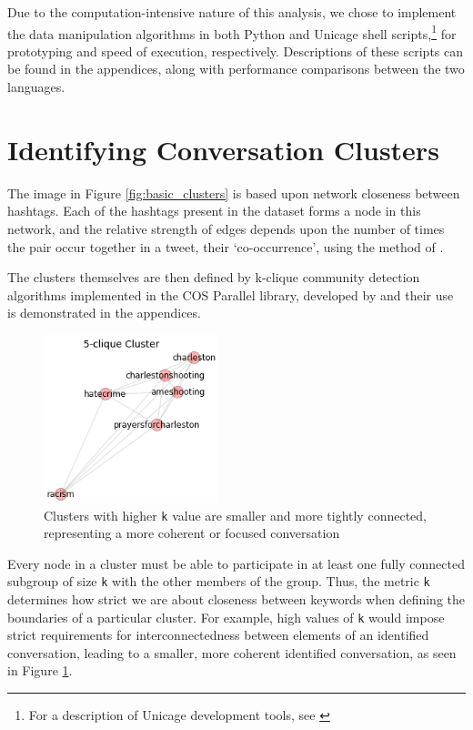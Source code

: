 \documentclass[12pt]{article}
\begin{document}
Due to the computation-intensive nature of this analysis, we chose to implement the data manipulation algorithms in both Python and Unicage shell scripts,\footnote{For a description of Unicage development tools, see \cite{Tounaka2013}} for prototyping and speed of execution, respectively. 
Descriptions of these scripts can be found in the appendices, along with performance comparisons between the two languages.

\section{Identifying Conversation Clusters}
The image in Figure \ref{fig:basic_clusters} is based upon network closeness between hashtags. Each of the hashtags present in the dataset forms a node in this network, and the relative strength of edges depends upon the number of times the pair occur together in a tweet, their `co-occurrence', using the method of \cite{Marres}.

The clusters themselves are then defined by k-clique community detection algorithms implemented in the COS Parallel library, developed by \cite{Gregori2013} and their use is demonstrated in the appendices.

\begin{figure}[!ht]
  \centering
    \includegraphics[width=0.45\textwidth]{F3_5clique_clusters.png}
    \caption{Clusters with higher \texttt{k} value are smaller and  more tightly connected, representing a more coherent  or focused conversation}
  \label{fig:5clique}
\end{figure}

Every node in a cluster must be able to participate in at least one fully connected subgroup of size \texttt{k} with the other members of the group. Thus, the metric \texttt{k} determines how strict we are about closeness between keywords when defining the boundaries of a particular cluster. 
For example, high values of \texttt{k} would impose strict requirements for interconnectedness between elements of an identified conversation, leading to a smaller, more coherent identified conversation, as seen in Figure \ref{fig:5clique}.
\end{document}
